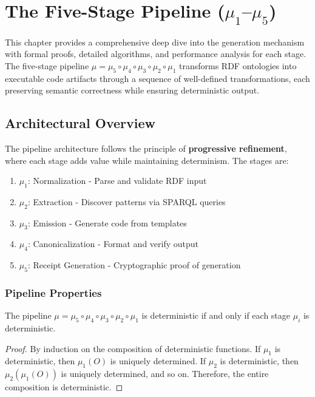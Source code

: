 \chapter{The Five-Stage Pipeline (\(\mu_1\)--\(\mu_5\))}

This chapter provides a comprehensive deep dive into the generation mechanism with formal proofs, detailed algorithms, and performance analysis for each stage. The five-stage pipeline \(\mu = \mu_5 \circ \mu_4 \circ \mu_3 \circ \mu_2 \circ \mu_1\) transforms RDF ontologies into executable code artifacts through a sequence of well-defined transformations, each preserving semantic correctness while ensuring deterministic output.

\section{Architectural Overview}

The pipeline architecture follows the principle of \textbf{progressive refinement}, where each stage adds value while maintaining determinism. The stages are:

\begin{enumerate}
    \item \(\mu_1\): Normalization - Parse and validate RDF input
    \item \(\mu_2\): Extraction - Discover patterns via SPARQL queries
    \item \(\mu_3\): Emission - Generate code from templates
    \item \(\mu_4\): Canonicalization - Format and verify output
    \item \(\mu_5\): Receipt Generation - Cryptographic proof of generation
\end{enumerate}

\subsection{Pipeline Properties}

\begin{theorem}
    The pipeline \(\mu = \mu_5 \circ \mu_4 \circ \mu_3 \circ \mu_2 \circ \mu_1\) is deterministic if and only if each stage \(\mu_i\) is deterministic.
\end{theorem}

\begin{proof}
    By induction on the composition of deterministic functions. If \(\mu_1\) is deterministic, then \(\mu_1(O)\) is uniquely determined. If \(\mu_2\) is deterministic, then \(\mu_2(\mu_1(O))\) is uniquely determined, and so on. Therefore, the entire composition is deterministic.
\end{proof}

